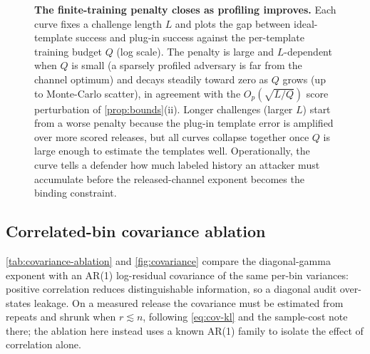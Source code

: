 \documentclass[11pt]{article}
\begin{document}
\begin{figure}[htbp]
\centering
\centering
{}

\caption{\textbf{The finite-training penalty closes as profiling improves.} Each curve fixes a challenge length \(L\) and plots the gap between ideal-template success and plug-in success against the per-template training budget \(Q\) (log scale). The penalty is large and \(L\)-dependent when \(Q\) is small (a sparsely profiled adversary is far from the channel optimum) and decays steadily toward zero as \(Q\) grows (up to Monte-Carlo scatter), in agreement with the \(O_p(\sqrt{L/Q})\) score perturbation of \cref{prop:bounds}(ii). Longer challenges (larger \(L\)) start from a worse penalty because the plug-in template error is amplified over more scored releases, but all curves collapse together once \(Q\) is large enough to estimate the templates well. Operationally, the curve tells a defender how much labeled history an attacker must accumulate before the released-channel exponent becomes the binding constraint.}
\label{fig:finite-training}
\end{figure}

\subsection{Correlated-bin covariance ablation}

\cref{tab:covariance-ablation} and \cref{fig:covariance} compare the diagonal-gamma exponent with an AR(1) log-residual covariance of the same per-bin variances: positive correlation reduces distinguishable information, so a diagonal audit over-states leakage. On a measured release the covariance must be estimated from repeats and shrunk when \(r\lesssim n\), following \eqref{eq:cov-kl} and the sample-cost note there; the ablation here instead uses a known AR(1) family to isolate the effect of correlation alone.
\end{document}
